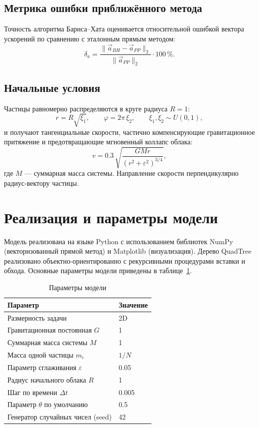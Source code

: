 \documentclass[12pt,a4paper]{article}
\begin{document}
	\subsection{Метрика ошибки приближённого метода}
	
	Точность алгоритма Барнса--Хата оценивается относительной ошибкой вектора ускорений по сравнению с эталонным прямым методом:
	\begin{equation}
		\delta_a = \frac{\| \vec a_{BH} - \vec a_{PP} \|_2}{\| \vec a_{PP} \|_2} \cdot 100\,\% .
		\label{eq:err}
	\end{equation}
	
	\subsection{Начальные условия}
	
	Частицы равномерно распределяются в круге радиуса $R = 1$:
	\begin{equation}
		r = R\sqrt{\xi_1}, \qquad \varphi = 2\pi\, \xi_2, \qquad \xi_1, \xi_2 \sim U(0,1),
	\end{equation}
	и получают тангенциальные скорости, частично компенсирующие гравитационное притяжение и предотвращающие мгновенный коллапс облака:
	\begin{equation}
		v = 0.3\, \sqrt{ \frac{G M r}{(r^2 + \varepsilon^2)^{3/4}} } ,
		\label{eq:v0}
	\end{equation}
	где $M$ --- суммарная масса системы. Направление скорости перпендикулярно радиус-вектору частицы.
	
	\section{Реализация и параметры модели}
	
	Модель реализована на языке Python с использованием библиотек NumPy (векторизованный прямой метод) и Matplotlib (визуализация). Дерево QuadTree реализовано объектно-ориентированно с рекурсивными процедурами вставки и обхода. Основные параметры модели приведены в таблице~\ref{tab:params}.
	
	\begin{table}[h]
		\centering
		\caption{Параметры модели}
		\label{tab:params}
		\begin{tabular}{ll}
			\toprule
			Параметр & Значение \\
			\midrule
			Размерность задачи & 2D \\
			Гравитационная постоянная $G$ & 1 \\
			Суммарная масса системы $M$ & 1 \\
			Масса одной частицы $m_i$ & $1/N$ \\
			Параметр сглаживания $\varepsilon$ & 0.05 \\
			Радиус начального облака $R$ & 1 \\
			Шаг по времени $\Delta t$ & 0.005 \\
			Параметр $\theta$ по умолчанию & 0.5 \\
			Генератор случайных чисел (seed) & 42 \\
			\bottomrule
		\end{tabular}
	\end{table}
	
\end{document}
